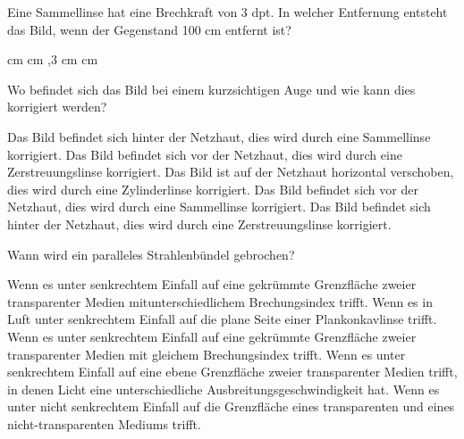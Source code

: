 \documentclass[11pt]{exam}
\begin{document}
\setlength{\voffset}{-0.5in}
\setlength{\headsep}{5pt}

\hspace{2mm}
 \hspace{5mm}
\vspace{4mm}

\begin{questions}

\question Eine Sammellinse hat eine Brechkraft von 3 dpt. In welcher Entfernung entsteht das Bild, wenn der Gegenstand 100 cm entfernt ist?

\begin{choices}
	 cm
	 cm
	\choice 150cm
	,3 cm
	 cm
\end{choices}

\vspace{3mm}\question Wo befindet sich das Bild bei einem kurzsichtigen Auge und wie kann dies korrigiert werden?

\begin{choices}
	\choice Das Bild befindet sich hinter der Netzhaut, dies wird durch eine Sammellinse korrigiert.
	\choice Das Bild befindet sich vor der Netzhaut, dies wird durch eine Zerstreuungslinse korrigiert.
	\choice Das Bild ist auf der Netzhaut horizontal verschoben, dies wird durch eine Zylinderlinse korrigiert.
	\choice Das Bild befindet sich vor der Netzhaut, dies wird durch eine Sammellinse korrigiert.
	\choice Das Bild befindet sich hinter der Netzhaut, dies wird durch eine Zerstreuungslinse korrigiert.
\end{choices}

\vspace{3mm}\question Wann wird ein paralleles Strahlenbündel gebrochen?

\begin{choices}
	\choice Wenn es unter senkrechtem Einfall auf eine gekrümmte Grenzfläche zweier transparenter Medien mitunterschiedlichem Brechungsindex trifft.
	\choice Wenn es in Luft unter senkrechtem Einfall auf die plane Seite einer Plankonkavlinse trifft.
	\choice Wenn es unter senkrechtem Einfall auf eine gekrümmte Grenzfläche zweier transparenter Medien mit gleichem Brechungsindex trifft.
	\choice Wenn es unter senkrechtem Einfall auf eine ebene Grenzfläche zweier transparenter Medien trifft, in denen Licht eine unterschiedliche Ausbreitungsgeschwindigkeit hat.
	\choice Wenn es unter nicht senkrechtem Einfall auf die Grenzfläche eines transparenten und eines nicht-transparenten Mediums trifft.
\end{choices}


\end{questions}
\end{document}
